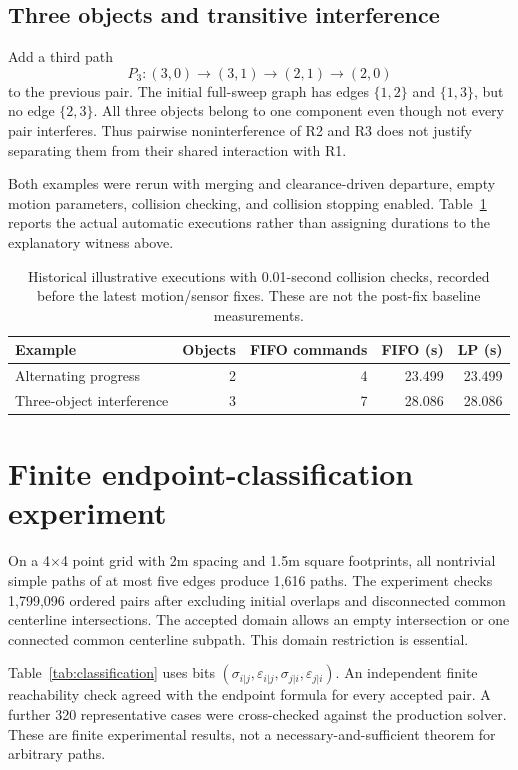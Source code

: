 \documentclass[11pt,a4paper]{article}
\theoremstyle{remark}
\begin{document}
\subsection{Three objects and transitive interference}
Add a third path
\begin{equation}
 P_3:(3,0)\to(3,1)\to(2,1)\to(2,0)
 \label{eq:third}
\end{equation}
to the previous pair. The initial full-sweep graph has edges $\{1,2\}$ and
$\{1,3\}$, but no edge $\{2,3\}$. All three objects belong to one component
even though not every pair interferes. Thus pairwise noninterference of R2
and R3 does not justify separating them from their shared interaction with R1.

Both examples were rerun with merging and clearance-driven departure, empty
motion parameters, collision checking, and collision stopping enabled.
Table~\ref{tab:small} reports the actual automatic executions rather than
assigning durations to the explanatory witness above.

\begin{table}[htbp]
\centering
\caption{Historical illustrative executions with 0.01-second collision checks, recorded before the latest motion/sensor fixes. These are not the post-fix baseline measurements.}
\label{tab:small}
\begin{tabular}{lrrrr}
\toprule
Example & Objects & FIFO commands & FIFO (s) & LP (s)\\
\midrule
Alternating progress & 2 & 4 & 23.499 & 23.499\\
Three-object interference & 3 & 7 & 28.086 & 28.086\\
\bottomrule
\end{tabular}
\end{table}

\section{Finite endpoint-classification experiment}

On a 4$\times$4 point grid with 2m spacing and 1.5m square footprints, all
nontrivial simple paths of at most five edges produce 1,616 paths.
The experiment checks 1,799,096 ordered pairs after excluding initial
overlaps and disconnected common centerline intersections. The accepted
domain allows an empty intersection or one connected common centerline
subpath. This domain restriction is essential.

Table~\ref{tab:classification} uses bits
$(\sigma_{i|j},\varepsilon_{i|j},\sigma_{j|i},\varepsilon_{j|i})$.
An independent finite reachability check agreed with the endpoint formula
for every accepted pair. A further 320 representative cases were
cross-checked against the production solver. These are finite experimental
results, not a necessary-and-sufficient theorem for arbitrary paths.
\end{document}
